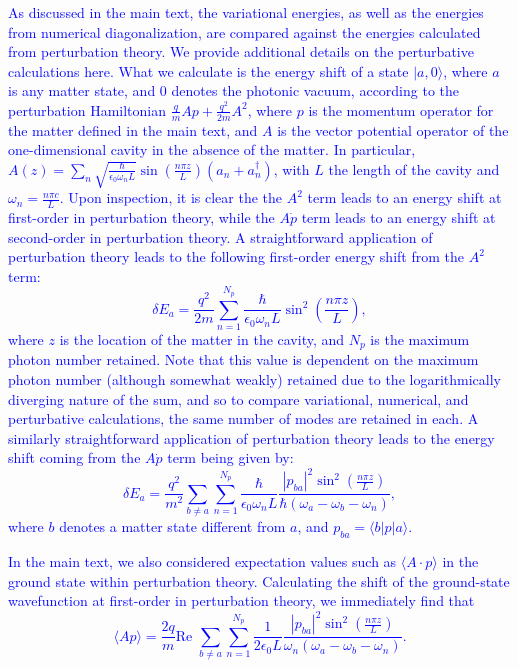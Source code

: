 \documentclass[aps,prb,onecolumn,preprint,
	groupedaddress,superscriptaddress,
	amsfonts,amssymb,amsmath,floatfix,
	citeautoscript]{revtex4-1}
\begin{document}
\textcolor{blue}{As discussed in the main text, the variational energies, as well as the energies from numerical diagonalization, are compared against the energies calculated from perturbation theory. We provide additional details on the perturbative calculations here. What we calculate is the energy shift of a state $|a,0\rangle$, where $a$ is any matter state, and $0$ denotes the photonic vacuum, according to the perturbation Hamiltonian $\frac{q}{m}Ap + \frac{q^2}{2m}A^2$, where $p$ is the momentum operator for the matter defined in the main text, and $A$ is the vector potential operator of the one-dimensional cavity in the absence of the matter. In particular, $A(z) = \sum_n\sqrt{\frac{\hbar}{\epsilon_0\omega_n L}}\sin\left(\frac{n\pi z}{L} \right) \left(a_n+a^{\dagger}_n\right)$, with $L$ the length of the cavity and $\omega_n = \frac{n\pi c}{L}$. Upon inspection, it is clear the the $A^2$ term leads to an energy shift at first-order in perturbation theory, while the $A\dot p$ term leads to an energy shift at second-order in perturbation theory. A straightforward application of perturbation theory leads to the following first-order energy shift from the $A^2$ term:
\begin{equation}
\delta E_a = \frac{q^2}{2m}\sum\limits_{n=1}^{N_p} \frac{\hbar}{\epsilon_0\omega_n L}\sin^2\left(\frac{n\pi z}{L}\right),
\end{equation}
where $z$ is the location of the matter in the cavity, and $N_p$ is the maximum photon number retained. Note that this value is dependent on the maximum photon number (although somewhat weakly) retained due to the logarithmically diverging nature of the sum, and so to compare variational, numerical, and perturbative calculations, the same number of modes are retained in each. A similarly straightforward application of perturbation theory leads to the energy shift coming from the $A\dot p$ term being given by:
\begin{equation}
\delta E_a = \frac{q^2}{m^2}\sum\limits_{b\neq a}\sum\limits_{n=1}^{N_p} \frac{\hbar}{\epsilon_0\omega_n L} \frac{|p_{ba}|^2\sin^2\left(\frac{n\pi z}{L} \right)}{\hbar(\omega_a - \omega_b - \omega_n)},
\end{equation}
where $b$ denotes a matter state different from $a$, and $p_{ba} = \langle b|p|a\rangle$.}

\textcolor{blue}{In the main text, we also considered expectation values such as $\langle A \cdot p \rangle$ in the ground state within perturbation theory. Calculating the shift of the ground-state wavefunction at first-order in perturbation theory, we immediately find that
\begin{equation}
\langle Ap \rangle = \frac{2q}{m} \text{Re } \sum\limits_{b\neq a}\sum\limits_{n=1}^{N_p} \frac{1}{2\epsilon_0L}\frac{|p_{ba}|^2\sin^2\left(\frac{n\pi z}{L}\right)}{\omega_n(\omega_a-\omega_b-\omega_n)}.
\end{equation}}
\end{document}
